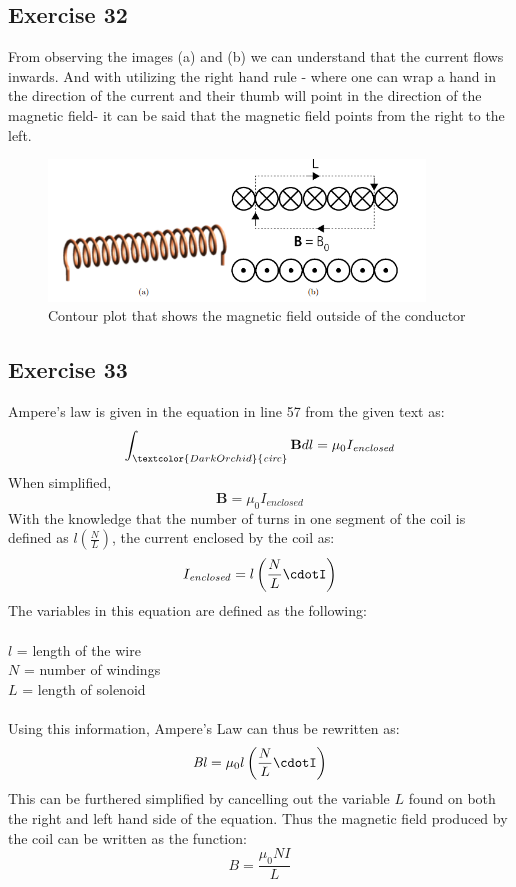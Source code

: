 \documentclass{article}
\begin{document}
\subsection{Exercise 32}
From observing the images (a) and (b) we can understand that the current flows inwards. And with utilizing the right hand rule - where one can wrap a hand in the direction of the current and their thumb will point in the direction of the magnetic field- it can be said that the magnetic field points from the right to the left. 
\begin{figure}[h!]
\includegraphics[width=10cm]{exercise32.PNG}
\centering
\caption{Contour plot that shows the magnetic field outside of the conductor }
\end{figure}

\subsection{Exercise 33}
Ampere's law is given in the equation in line 57 from the given text as:
\begin{equation}
    \int_{\textcolor{DarkOrchid}{\mathit{circ}}}^{}\mathbf{B}dl=\mu_{0}I_{\mathit{enclosed}}
\end{equation}
When simplified,
\begin{equation}
    \mathbf{B}=\mu_{0}I_{\mathit{enclosed}}
\end{equation}
With the knowledge that the number of turns in one segment of the coil is defined as $l (\frac{N}{L})$, the current enclosed by the coil as:
\begin{equation} 
    I_{\mathit{enclosed}}=l\left(\frac{N}{L}\cdotI\right)
\end{equation}
The variables in this equation are defined as the following:
\\
\\
$l$ = length of the wire
\\
$N$ = number of windings
\\
$L$ = length of solenoid
\\
\\
Using this information, Ampere's Law can thus be rewritten as:
\begin{equation}
    \mathit{Bl}=\mu_{0}l\left(\frac{N}{L}\cdotI\right)
\end{equation}
This can be furthered simplified by cancelling out the variable $L$ found on both the right and left hand side of the equation. Thus the magnetic field produced by the coil can be written as the function:
\begin{equation}
    B=\frac{\mu_{0}\mathit{NI}}{L}
\end{equation}
\end{document}
